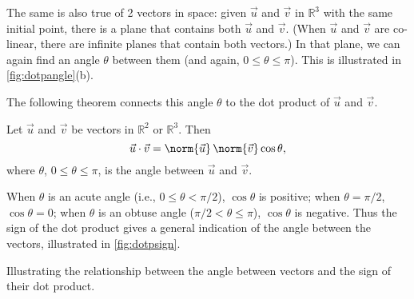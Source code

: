 The same is also true of 2 vectors in space: given $\vec u$ and $\vec v$ in $\mathbb{R}^3$ with the same initial point, there is a plane that contains both $\vec u$ and $\vec v$. (When $\vec u$ and $\vec v$ are co-linear, there are infinite planes that contain both vectors.) In that plane, we can again find an angle $\theta$ between them (and again, $0\leq \theta\leq \pi$). This is illustrated in \autoref{fig:dotpangle}(b).

The following theorem connects this angle $\theta$ to the dot product of $\vec u$ and $\vec v$.

\begin{theorem}\label{thm:dot_product}%
Let $\vec u$ and $\vec v$ be vectors in $\mathbb{R}^2$ or $\mathbb{R}^3$. Then 
\[\vec u\cdot\vec v = \norm{\vec u}\,\norm{\vec v} \cos\theta,\]
where $\theta$, $0\leq\theta\leq \pi$, is the angle between $\vec u$ and $\vec v$.
\end{theorem}

When $\theta$ is an acute angle (i.e., $0\leq \theta <\pi/2$), $\cos \theta$ is positive; when $\theta = \pi/2$, $\cos \theta = 0$; when $\theta$ is an obtuse angle ($\pi/2<\theta \leq \pi$), $\cos \theta$ is negative. Thus the sign of the dot product gives a general indication of the angle between the vectors, illustrated in \autoref{fig:dotpsign}.

\noindent\begin{minipage}[t]{\linewidth}\noindent%
\captionsetup{type=figure}%
\centering
{}
\caption{Illustrating the relationship between the angle between vectors and the sign of their dot product.}
\label{fig:dotpsign}
\end{minipage}

